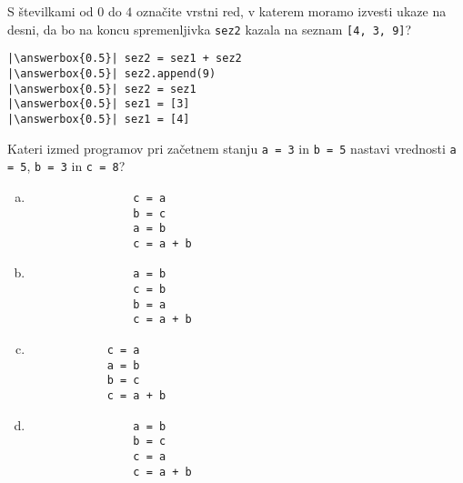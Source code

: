 \documentclass[arhiv, 10pt]{../izpit}
\newcommand{\inlinepy}[1]{\texttt{#1}}
\newcommand{\answerbox}[1]{\framebox{\vphantom{\large M}\hspace{#1cm}}}
\begin{document}
        \naloga*
        \begin{multicols}{2}
        \noindent 
        S številkami od $0$ do $4$ označite vrstni red, v katerem moramo izvesti ukaze na desni, da bo na koncu spremenljivka \inlinepy{sez2} kazala na seznam \inlinepy{[4, 3, 9]}?
    
        \columnbreak
        \noindent
        \begin{verbatim}
|\answerbox{0.5}| sez2 = sez1 + sez2
|\answerbox{0.5}| sez2.append(9)
|\answerbox{0.5}| sez2 = sez1
|\answerbox{0.5}| sez1 = [3]
|\answerbox{0.5}| sez1 = [4]

        \end{verbatim}
        \end{multicols}
    
            
        \naloga*
        
        Kateri izmed programov pri začetnem stanju
            \inlinepy{a = 3} in
            \inlinepy{b = 5}
        nastavi vrednosti
            \inlinepy{a = 5},
            \inlinepy{b = 3} in
            \inlinepy{c = 8}?
    
        \begin{multicols}{4}
        \begin{enumerate}[(a)]
\item 
                \begin{verbatim}
                c = a
                b = c
                a = b
                c = a + b
                \end{verbatim}
            
\item 
                \begin{verbatim}
                a = b
                c = b
                b = a
                c = a + b
                \end{verbatim}
            
\item 
            \begin{verbatim}
            c = a
            a = b
            b = c
            c = a + b
            \end{verbatim}
        
\item 
                \begin{verbatim}
                a = b
                b = c
                c = a
                c = a + b
                \end{verbatim}
            
\end{enumerate}

        \end{multicols}
    
\end{document}

